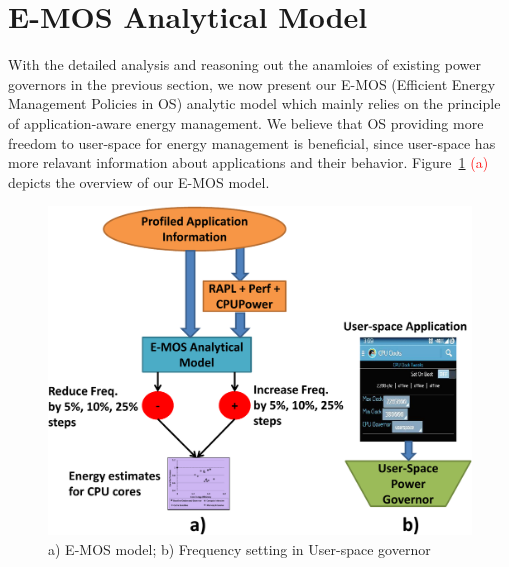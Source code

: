 \section{E-MOS Analytical Model}\label{sec:analytic}

With the detailed analysis and reasoning out the anamloies 
of existing power governors in the previous section, we now present our 
E-MOS (Efficient Energy Management Policies in OS) analytic model
which mainly relies on the principle of application-aware energy management. 
We believe that OS providing more freedom to user-space for energy
management is beneficial, since user-space has more relavant information about applications
and their behavior. 
Figure~\ref{fig:emos-model} \textcolor{red}{(a)} depicts the overview
of our E-MOS model.


\begin{figure}[h]
  \begin{center}
\includegraphics[width=\linewidth]{figs/EMOS-new-crop.pdf}
  \end{center}
  \vspace{-0.1in}
  \caption{a) E-MOS model; b) Frequency setting in User-space governor}
	\label{fig:emos-model}
\end{figure}





